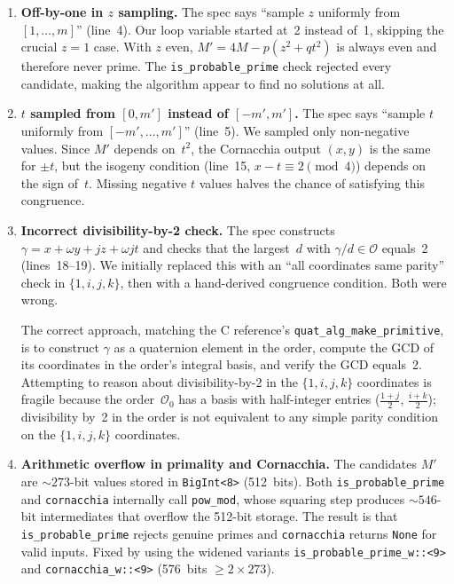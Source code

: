 \begin{enumerate}
  \item \textbf{Off-by-one in $z$ sampling.}
    The spec says ``sample $z$ uniformly from $[1, \ldots, m]$''
    (line~4).  Our loop variable started at~2 instead of~1, skipping
    the crucial $z = 1$ case.  With $z$ even, $M' = 4M - p(z^2 + qt^2)$
    is always even and therefore never prime.  The \texttt{is\_probable\_prime}
    check rejected every candidate, making the algorithm appear to
    find no solutions at all.

  \item \textbf{$t$ sampled from $[0, m']$ instead of $[-m', m']$.}
    The spec says ``sample $t$ uniformly from $[-m', \ldots, m']$''
    (line~5).  We sampled only non-negative values.  Since $M'$ depends
    on~$t^2$, the Cornacchia output $(x, y)$ is the same for $\pm t$,
    but the isogeny condition (line~15, $x - t \equiv 2 \pmod{4}$)
    depends on the sign of~$t$.  Missing negative $t$ values halves
    the chance of satisfying this congruence.

  \item \textbf{Incorrect divisibility-by-2 check.}
    The spec constructs $\gamma = x + \omega y + jz + \omega jt$ and
    checks that the largest~$d$ with $\gamma/d \in \mathcal{O}$ equals~2
    (lines~18--19).  We initially replaced this with an ``all
    coordinates same parity'' check in $\{1, i, j, k\}$, then with
    a hand-derived congruence condition.  Both were wrong.

    The correct approach, matching the C reference's
    \texttt{quat\_alg\_make\_primitive}, is to construct $\gamma$ as a
    quaternion element in the order, compute the GCD of its coordinates
    in the order's integral basis, and verify the GCD equals~2.
    Attempting to reason about divisibility-by-2 in the
    $\{1, i, j, k\}$ coordinates is fragile because
    the order~$\mathcal{O}_0$ has a basis with half-integer entries
    ($\frac{1+j}{2}$, $\frac{i+k}{2}$); divisibility by~2 in the
    order is not equivalent to any simple parity condition on the
    $\{1, i, j, k\}$ coordinates.

  \item \textbf{Arithmetic overflow in primality and Cornacchia.}
    The candidates $M'$ are ${\sim}273$-bit values stored in
    \texttt{BigInt<8>} (512~bits).  Both \texttt{is\_probable\_prime}
    and \texttt{cornacchia} internally call \texttt{pow\_mod}, whose
    squaring step produces ${\sim}546$-bit intermediates that overflow
    the 512-bit storage.  The result is that
    \texttt{is\_probable\_prime} rejects genuine primes and
    \texttt{cornacchia} returns \texttt{None} for valid inputs.  Fixed
    by using the widened variants \texttt{is\_probable\_prime\_w::<9>}
    and \texttt{cornacchia\_w::<9>} (576~bits $\geq 2 \times 273$).


\end{enumerate}
